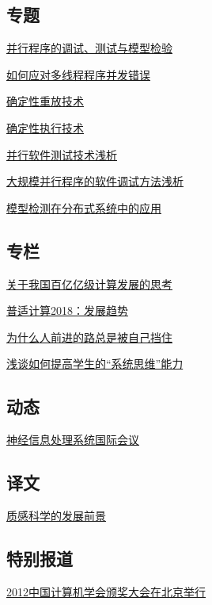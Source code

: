 \documentclass[a4paper]{article}
\begin{document}
\subsection{专题}
\href{http://history.ccf.org.cn/resources/1190201776262/2013/02/17/1.pdf}{并行程序的调试、测试与模型检验}

\href{http://history.ccf.org.cn/resources/1190201776262/2013/02/17/2.pdf}{如何应对多线程程序并发错误}

\href{http://history.ccf.org.cn/resources/1190201776262/2013/02/17/3.pdf}{确定性重放技术}

\href{http://history.ccf.org.cn/resources/1190201776262/2013/02/17/4.pdf}{确定性执行技术}

\href{http://history.ccf.org.cn/resources/1190201776262/2013/02/17/5.pdf}{并行软件测试技术浅析}

\href{http://history.ccf.org.cn/resources/1190201776262/2013/02/17/6.pdf}{大规模并行程序的软件调试方法浅析}

\href{http://history.ccf.org.cn/resources/1190201776262/2013/02/17/7.pdf}{模型检测在分布式系统中的应用}

\subsection{专栏}
\href{http://history.ccf.org.cn/resources/1190201776262/2013/02/17/8.pdf}{关于我国百亿亿级计算发展的思考}

\href{http://history.ccf.org.cn/resources/1190201776262/2013/02/17/9.pdf}{普适计算2018：发展趋势}

\href{http://history.ccf.org.cn/resources/1190201776262/2013/02/17/10.pdf}{为什么人前进的路总是被自己挡住}

\href{http://history.ccf.org.cn/resources/1190201776262/2013/02/17/11.pdf}{浅谈如何提高学生的“系统思维”能力}

\subsection{动态}
\href{http://history.ccf.org.cn/resources/1190201776262/2013/02/17/12.pdf}{神经信息处理系统国际会议}

\subsection{译文}
\href{http://history.ccf.org.cn/resources/1190201776262/2013/02/17/13.pdf}{质感科学的发展前景}

\subsection{特别报道}
\href{http://history.ccf.org.cn/resources/1190201776262/2013/02/22/0.pdf}{2012中国计算机学会颁奖大会在北京举行}
\end{document}
